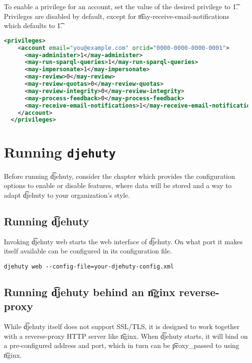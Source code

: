   To enable a privilege for an account, set the value of the desired privilege
  to \t{1}.  Privileges are disabled by default, except for
  \t{may-receive-email-notifications} which defaults to \t{1}.

\begin{lstlisting}[language=xml]
  <privileges>
    <account email="you@example.com" orcid="0000-0000-0000-0001">
      <may-administer>1</may-administer>
      <may-run-sparql-queries>1</may-run-sparql-queries>
      <may-impersonate>1</may-impersonate>
      <may-review>0</may-review>
      <may-review-quotas>0</may-review-quotas>
      <may-review-integrity>0</may-review-integrity>
      <may-process-feedback>0</may-process-feedback>
      <may-receive-email-notifications>1</may-receive-email-notifications>
    </account>
  </privileges>
\end{lstlisting}

\chapter{Running \texttt{djehuty}}
\label{chap:running-djehuty}

  Before running \t{djehuty}, consider the chapter
   which provides the configuration options
  to enable or disable features, where data will be stored and a way to
  adapt \t{djehuty} to your organization's style.

\section{Running \t{djehuty}}

  Invoking \t{djehuty web} starts the web interface of \t{djehuty}.  On what
  port it makes itself available can be configured in its configuration file.

\begin{lstlisting}
djehuty web --config-file=your-djehuty-config.xml
\end{lstlisting}

\section{Running \t{djehuty} behind an \t{nginx} reverse-proxy}

  While \t{djehuty} itself does not support SSL/TLS, it is designed to
  work together with a reverse-proxy HTTP server like \t{nginx}.  When
  \t{djehuty} starts, it will bind on a pre-configured address and port,
  which in turn can be \t{proxy\_pass}ed to using \t{nginx}.

